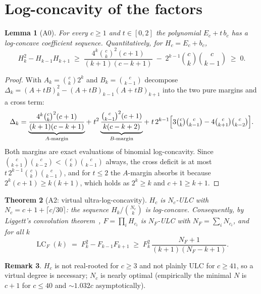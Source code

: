 \documentclass[11pt]{article}
\newtheorem{theorem}{Theorem}[section]
\newtheorem{lemma}[theorem]{Lemma}
\theoremstyle{definition}
\newtheorem{remark}[theorem]{Remark}
\DeclareMathOperator{\lc}{LC}
\begin{document}
\section{Log-concavity of the factors}\label{sec:factors}

\begin{lemma}[A0]\label{lem:a0}
For every $c\ge1$ and $t\in[0,2]$ the polynomial $E_c+t\,b_c$ has a
log-concave coefficient sequence.  Quantitatively, for $H_c=E_c+b_c$,
\[
  H_k^2-H_{k-1}H_{k+1}\;\ge\;
  \frac{4^k\binom ck^2(c+1)}{(k+1)(c-k+1)}
  \;-\;2^{k-1}\binom ck\binom c{k-1}\;\ge\;0 .
\]
\end{lemma}

\begin{proof}
With $A_k=\binom ck2^k$ and $B_k=\binom c{k-1}$ decompose
$\Delta_k=(A+tB)_k^2-(A+tB)_{k-1}(A+tB)_{k+1}$ into the two pure
margins and a cross term:
\[
  \Delta_k=\underbrace{\frac{4^k\binom ck^2(c+1)}{(k+1)(c-k+1)}}_{A\text{-margin}}
  +\;t^2\underbrace{\frac{\binom c{k-1}^2(c+1)}{k(c-k+2)}}_{B\text{-margin}}
  +\;t\,2^{k-1}\Bigl[3\tbinom ck\tbinom c{k-1}-4\tbinom c{k+1}\tbinom c{k-2}\Bigr].
\]
Both margins are exact evaluations of binomial log-concavity.  Since
$\binom c{k+1}\binom c{k-2}<\binom ck\binom c{k-1}$ always, the cross
deficit is at most $t\,2^{k-1}\binom ck\binom c{k-1}$, and for $t\le2$
the $A$-margin absorbs it because
$2^{k}(c+1)\ge k(k+1)$, which holds as $2^k\ge k$ and $c+1\ge k+1$.
\end{proof}

\begin{theorem}[A2: virtual ultra-log-concavity]\label{thm:a2}
$H_c$ is $N_c$-ULC with $N_c=c+1+\lceil c/30\rceil$: the sequence
$H_k/\binom{N_c}k$ is log-concave.  Consequently, by Liggett's
convolution theorem~\cite{Liggett}, $F=\prod_iH_{c_i}$ is $N_F$-ULC
with $N_F=\sum_iN_{c_i}$, and for all $k$
\[
  \lc_F(k)\;=\;F_k^2-F_{k-1}F_{k+1}\;\ge\;
  F_k^2\,\frac{N_F+1}{(k+1)(N_F-k+1)} .
\]
\end{theorem}

\begin{remark}
$H_c$ is not real-rooted for $c\ge3$ and not plainly ULC for
$c\ge41$, so a virtual degree is necessary; $N_c$ is nearly optimal
(empirically the minimal $N$ is $c+1$ for $c\le40$ and
${\sim}1.032c$ asymptotically).
\end{remark}
\end{document}

